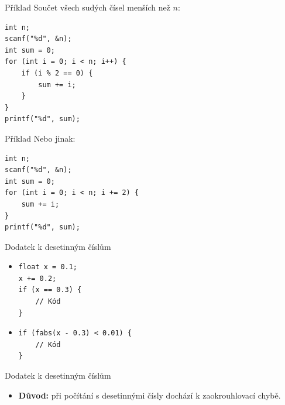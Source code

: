 \documentclass[14pt,aspectratio=169]{beamer}
\begin{document}
    \begin{frame}[t,fragile]{Příklad}
        Součet všech sudých čísel menších než $n$:
        \begin{lstlisting}
int n;
scanf("%d", &n);
int sum = 0;
for (int i = 0; i < n; i++) {
    if (i % 2 == 0) {
        sum += i;
    }
}
printf("%d", sum);
        \end{lstlisting}
    \end{frame}

    \begin{frame}[t,fragile]{Příklad}
        Nebo jinak:
        \begin{lstlisting}
int n;
scanf("%d", &n);
int sum = 0;
for (int i = 0; i < n; i += 2) {
    sum += i;
}
printf("%d", sum);
        \end{lstlisting}
    \end{frame}

    \begin{frame}[t,fragile]{Dodatek k desetinným číslům}
        \begin{itemize}
            \item {}
            \begin{lstlisting}
float x = 0.1;
x += 0.2;
if (x == 0.3) {
    // Kód
}
            \end{lstlisting}
            \item {}
            \begin{lstlisting}
if (fabs(x - 0.3) < 0.01) {
    // Kód
}
            \end{lstlisting}
        \end{itemize}
    \end{frame}

    \begin{frame}[t]{Dodatek k desetinným číslům}
        \begin{itemize}
            \item \textbf{Důvod:} při počítání s desetinnými čísly dochází k zaokrouhlovací chybě.
        \end{itemize}
    \end{frame}
\end{document}
